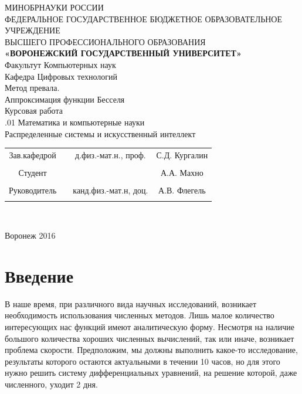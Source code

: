 \documentclass[14pt]{extarticle}
\begin{document}
\begin{center}
	\hfill \break
	\large{МИНОБРНАУКИ РОССИИ}\\
	\footnotesize{ФЕДЕРАЛЬНОЕ ГОСУДАРСТВЕННОЕ БЮДЖЕТНОЕ ОБРАЗОВАТЕЛЬНОЕ УЧРЕЖДЕНИЕ}\\
	\footnotesize{ВЫСШЕГО ПРОФЕССИОНАЛЬНОГО ОБРАЗОВАНИЯ}\\
	\small{\textbf{«ВОРОНЕЖСКИЙ ГОСУДАРСТВЕННЫЙ УНИВЕРСИТЕТ»}}\\
	\hfill \break
	\normalsize{Факультут Компьютерных наук}\\
	\hfill \break
	\normalsize{Кафедра Цифровых технологий}\\
	\hfill\break
	\hfill \break
	\hfill \break
	\hfill \break
	\large{Метод превала.\\ Аппроксимация функции Бесселя}\\
	\hfill \break
	\hfill \break
	\hfill \break
	\normalsize{Курсовая работа\\
		\hfill {}.01 Математика и компьютерные науки\\
		\hfill \break
		Распределенные системы и искусственный интеллект}\\
	\hfill \break
	\hfill \break
\end{center}

\hfill \break
\hfill \break

\normalsize{
	\begin{tabular}{cccc}
		Зав.кафедрой & \underline{\hspace{3cm}} &  д.физ.-мат.н.,  проф. & С.Д. Кургалин \\\\
		Студент & \underline{\hspace{3cm}} & &А.А. Махно \\\\
		Руководитель & \underline{\hspace{3cm}}& канд.физ.-мат.н, доц.&  А.В. Флегель \\\\
	\end{tabular}
}\\
\hfill \break
\hfill \break
\begin{center} Воронеж 2016 \end{center}
\thispagestyle{empty} %

\newpage	
\tableofcontents
\thispagestyle{empty} %
\newpage	
\section{Введение}
В наше время, при различного вида научных исследований, возникает необходимость использования численных методов. Лишь малое количество интересующих нас функций имеют аналитическую форму. Несмотря на наличие большого количества хороших численных вычислений, так или иначе, возникает проблема скорости. Предположим, мы должны выполнить какое-то исследование, результаты которого остаются актуальными в течении 10 часов, но для этого нужно решить систему дифференциальных уравнений, на решение которой, даже численного, уходит 2 дня. 
\end{document}
